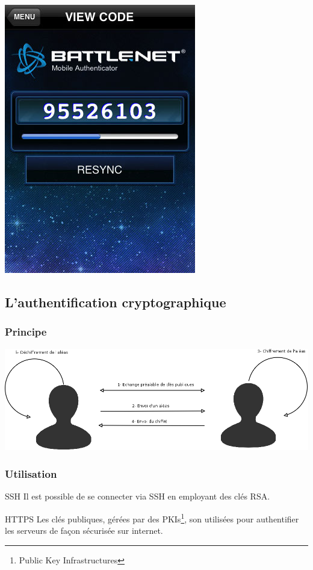 \documentclass[xcolor=table]{beamer}
\begin{document}
\begin{frame}
\begin{center}
\includegraphics[scale=0.405]{../graphics/blizzardauth.jpg}
\end{center}


\end{frame}

\subsection{L'authentification cryptographique}
\begin{frame}
\frametitle{Principe}
\includegraphics[scale=0.24]{../graphics/authcrypt.png}
\end{frame}

\begin{frame}
\frametitle{Utilisation}
\begin{block}{SSH}
Il est possible de se connecter via SSH en employant des clés RSA.
\end{block}

\begin{block}{HTTPS}
Les clés publiques, gérées par des PKIs\footnote{Public Key Infrastructures}, son utilisées pour authentifier les serveurs de façon sécurisée sur internet.
\end{block}
\end{frame}
\end{document}
